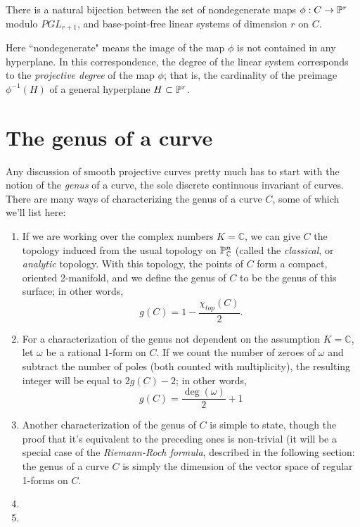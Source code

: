 \documentclass[12pt, leqno]{book}
\def\CC{{\mathbb C}}
\begin{document}
\begin{proposition}
There is a natural bijection between the set of nondegenerate maps $\phi : C \to {\mathbb P}^r$ modulo $PGL_{r+1}$, and base-point-free linear systems of dimension $r$ on $C$.
\end{proposition}

Here ``nondegenerate" means the image of the map $\phi$ is not contained in any hyperplane. In this correspondence, the degree of the linear system corresponds to the \emph{projective degree} of the map $\phi$; that is, the cardinality of the preimage $\phi^{-1}(H)$ of a general hyperplane $H \subset {\mathbb P}^r$.


\section{The genus of a curve}

Any discussion of smooth projective curves pretty much has to start with the notion of the \emph{genus} of a curve, the sole discrete continuous invariant of curves. There are many ways of characterizing the genus of a curve $C$, some of which we'll list here:

\begin{enumerate}

\item If we are working over the complex numbers $K = \CC$, we can give $C$ the topology induced from the usual topology on $\PP^n_\CC$ (called the \emph{classical}, or \emph{analytic} topology. With this topology, the points of $C$ form a compact, oriented 2-manifold, and we define the genus of $C$ to be the genus of this surface; in other words,
$$
g(C) = 1 - \frac{\chi_{top}(C)}{2}.
$$

\item For a characterization of the genus not dependent on the assumption $K = \CC$, let $\omega$ be a rational 1-form on $C$. If we count the number of zeroes of $\omega$ and subtract the number of poles (both counted with multiplicity), the resulting integer will be equal to $2g(C) - 2$; in other words,
$$
g(C) = \frac{\deg(\omega)}{2} + 1
$$

\item Another characterization of the genus of $C$ is simple to state, though the proof that it's equivalent to the preceding ones is non-trivial (it will be a special case of the \emph{Riemann-Roch formula}, described in the following section: the genus of a curve $C$ is simply the dimension of the vector space of regular 1-forms on $C$.

\item 

\item 

\end{enumerate}

 
\end{document}
